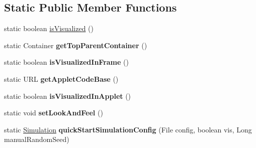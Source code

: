 \subsection*{Static Public Member Functions}
\begin{DoxyCompactItemize}
\item 
static boolean \hyperlink{classorg_1_1contikios_1_1cooja_1_1Cooja_aa127774e211a01a333338c4434e9cd77}{is\-Visualized} ()
\item 
\hypertarget{classorg_1_1contikios_1_1cooja_1_1Cooja_a1a5a40f84add4ec6c49d090adfd8993e}{static Container {\bfseries get\-Top\-Parent\-Container} ()}\label{classorg_1_1contikios_1_1cooja_1_1Cooja_a1a5a40f84add4ec6c49d090adfd8993e}

\item 
\hypertarget{classorg_1_1contikios_1_1cooja_1_1Cooja_a88c28eb289131a1226a95970e11b7010}{static boolean {\bfseries is\-Visualized\-In\-Frame} ()}\label{classorg_1_1contikios_1_1cooja_1_1Cooja_a88c28eb289131a1226a95970e11b7010}

\item 
\hypertarget{classorg_1_1contikios_1_1cooja_1_1Cooja_ae92242683bcd34c7493c90900bac4e5a}{static U\-R\-L {\bfseries get\-Applet\-Code\-Base} ()}\label{classorg_1_1contikios_1_1cooja_1_1Cooja_ae92242683bcd34c7493c90900bac4e5a}

\item 
\hypertarget{classorg_1_1contikios_1_1cooja_1_1Cooja_a28b8e4ba3ccf4ae3b9ff0d92d09e23ea}{static boolean {\bfseries is\-Visualized\-In\-Applet} ()}\label{classorg_1_1contikios_1_1cooja_1_1Cooja_a28b8e4ba3ccf4ae3b9ff0d92d09e23ea}

\item 
\hypertarget{classorg_1_1contikios_1_1cooja_1_1Cooja_af32c56e136b759c60ac321b86fbee495}{static void {\bfseries set\-Look\-And\-Feel} ()}\label{classorg_1_1contikios_1_1cooja_1_1Cooja_af32c56e136b759c60ac321b86fbee495}

\item 
\hypertarget{classorg_1_1contikios_1_1cooja_1_1Cooja_a32e7dc5b4d7c2471746cf516bcbe7164}{static \hyperlink{classorg_1_1contikios_1_1cooja_1_1Simulation}{Simulation} {\bfseries quick\-Start\-Simulation\-Config} (File config, boolean vis, Long manual\-Random\-Seed)}\label{classorg_1_1contikios_1_1cooja_1_1Cooja_a32e7dc5b4d7c2471746cf516bcbe7164}


\end{DoxyCompactItemize}
